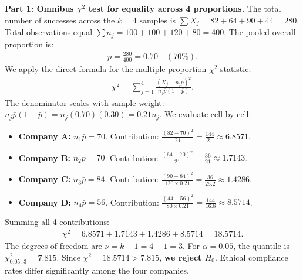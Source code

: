 \begin{solproblema}
	\textbf{Part 1: Omnibus $\chi^2$ test for equality across 4 proportions.}
	The total number of successes across the $k=4$ samples is $\sum X_j = 82 + 64 + 90 + 44 = 280$. Total observations equal $\sum n_j = 100 + 100 + 120 + 80 = 400$. The pooled overall proportion is:
	\begin{align}
		\bar{p} = \frac{280}{400} = 0.70 \quad (70\%).
	\end{align}
	We apply the direct formula for the multiple proportion $\chi^2$ statistic:
	\begin{align}
		\chi^2 = \sum_{j=1}^4 \frac{(X_j - n_j \bar{p})^2}{n_j \bar{p}(1-\bar{p})}.
	\end{align}
	The denominator scales with sample weight: $n_j \bar{p}(1-\bar{p}) = n_j(0.70)(0.30) = 0.21 n_j$. We evaluate cell by cell:
	\begin{itemize}
		\item \textbf{Company A:} $n_1 \bar{p} = 70$. Contribution: $\frac{(82 - 70)^2}{21} = \frac{144}{21} \approx 6.8571$.
		\item \textbf{Company B:} $n_2 \bar{p} = 70$. Contribution: $\frac{(64 - 70)^2}{21} = \frac{36}{21} \approx 1.7143$.
		\item \textbf{Company C:} $n_3 \bar{p} = 84$. Contribution: $\frac{(90 - 84)^2}{120 \times 0.21} = \frac{36}{25.2} \approx 1.4286$.
		\item \textbf{Company D:} $n_4 \bar{p} = 56$. Contribution: $\frac{(44 - 56)^2}{80 \times 0.21} = \frac{144}{16.8} \approx 8.5714$.
	\end{itemize}
	Summing all 4 contributions:
	\begin{align}
		\chi^2 = 6.8571 + 1.7143 + 1.4286 + 8.5714 = 18.5714.
	\end{align}
	The degrees of freedom are $\nu = k - 1 = 4 - 1 = 3$. For $\alpha = 0.05$, the quantile is $\chi^2_{0.05, \, 3} = 7.815$.
	Since $\chi^2 = 18.5714 > 7.815$, \textbf{we reject $H_0$}. Ethical compliance rates differ significantly among the four companies.
	

\end{solproblema}
